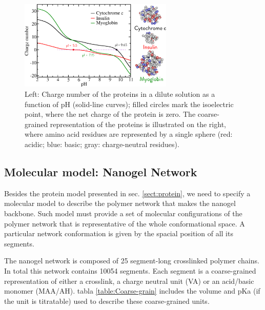  \begin{figure}[!htb]
     \centering
     \includegraphics[width=0.65\textwidth]{Figures/graphs-gel2/protein-model.png}
     \caption{Left: Charge number of the proteins in a dilute solution as a function of  pH (solid-line curves);
     filled circles mark  the isoelectric point,
     where the net charge of the protein is zero.
     The coarse-grained representation of the proteins is illustrated on the right, where amino acid residues are represented by a single sphere (red: acidic; blue: basic; gray: charge-neutral residues).}
     \label{fig:esf:protein-charge}
 \end{figure}






 





\subsection{Molecular model: Nanogel Network}

Besides the protein model presented in sec.  \ref{sect:protein},   we need to specify a molecular model to describe the polymer network that makes the nanogel backbone.
Such model must provide  a set of molecular configurations of the polymer network that is representative of the whole conformational space.
A particular network conformation is given by the spacial position of all its segments.


The nanogel network is composed of 25 segment-long  crosslinked polymer chains. 
In total this network contains 10054 segments.
Each segment is a coarse-grained   representation of either a crosslink, a charge neutral unit (VA) or an acid/basic monomer (MAA/AH). 
tabla \ref{table:Coarse-grain} includes the volume and pKa (if the unit is titratable) used to describe these coarse-grained units.

